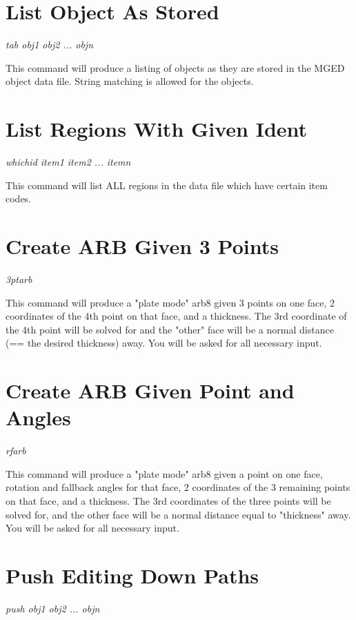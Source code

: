 \section{List Object As Stored}

{\em \center
tab obj1 obj2 ... objn
}

This command will produce a listing of objects as they are stored in
the MGED object data file.
String matching is allowed for the objects.

\section{List Regions With Given Ident}

{\em \center
whichid item1 item2 ... itemn
}

This command will list ALL regions in the data file which have certain
item codes.

\section{Create ARB Given 3 Points}

{\em \center
3ptarb
}

This command will produce a "plate mode" arb8 given 3 points on one face, 2 coordinates
of the 4th point on that face, and a thickness.
The 3rd coordinate of the 4th point will be solved for and the "other" face
will be a normal distance (== the desired thickness) away.
You will be asked for all necessary input.

\section{Create ARB Given Point and Angles}

{\em \center
rfarb
}

This command will produce a "plate mode" arb8 given a point on one face, 
rotation and fallback angles for that face, 2 coordinates of the 3
remaining points on that face, and a thickness.
The 3rd coordinates of the three points will be solved for, and the other
face will be a normal distance equal to "thickness" away.
You will be asked for all necessary input.

\section{Push Editing Down Paths}

{\em \center
push obj1 obj2 ... objn
}

